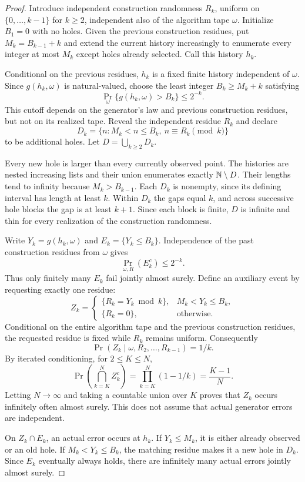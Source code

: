 \begin{proof}
Introduce independent construction randomness $R_k$, uniform on $\{0,\ldots,k-1\}$ for $k\ge2$, independent also of the algorithm tape $\omega$. Initialize $B_1=0$ with no holes. Given the previous construction residues, put $M_k=B_{k-1}+k$ and extend the current history increasingly to enumerate every integer at most $M_k$ except holes already selected. Call this history $h_k$.

Conditional on the previous residues, $h_k$ is a fixed finite history independent of $\omega$. Since $g(h_k,\omega)$ is natural-valued, choose the least integer $B_k\ge M_k+k$ satisfying
\[
\Pr_\omega\{g(h_k,\omega)>B_k\}\le2^{-k}.
\]
This cutoff depends on the generator's law and previous construction residues, but not on its realized tape. Reveal the independent residue $R_k$ and declare
\[
D_k=\{n:M_k<n\le B_k,\ n\equiv R_k\pmod k\}
\]
to be additional holes. Let $D=\bigcup_{k\ge2}D_k$.

Every new hole is larger than every currently observed point. The histories are nested increasing lists and their union enumerates exactly $\mathbb N\setminus D$. Their lengths tend to infinity because $M_k>B_{k-1}$. Each $D_k$ is nonempty, since its defining interval has length at least $k$. Within $D_k$ the gaps equal $k$, and across successive hole blocks the gap is at least $k+1$. Since each block is finite, $D$ is infinite and thin for every realization of the construction randomness.

Write $Y_k=g(h_k,\omega)$ and $E_k=\{Y_k\le B_k\}$. Independence of the past construction residues from $\omega$ gives
\[
\Pr_{\omega,R}(E_k^c)\le2^{-k}.
\]
Thus only finitely many $E_k$ fail jointly almost surely. Define an auxiliary event by requesting exactly one residue:
\[
Z_k=
\begin{cases}
\{R_k=Y_k\bmod k\},& M_k<Y_k\le B_k,\\
\{R_k=0\},&\text{otherwise}.
\end{cases}
\]
Conditional on the entire algorithm tape and the previous construction residues, the requested residue is fixed while $R_k$ remains uniform. Consequently
\[
\Pr(Z_k\mid\omega,R_2,\ldots,R_{k-1})=1/k.
\]
By iterated conditioning, for $2\le K\le N$,
\[
\Pr\left(\bigcap_{k=K}^N Z_k^c\right)
=\prod_{k=K}^N(1-1/k)=\frac{K-1}{N}.
\]
Letting $N\to\infty$ and taking a countable union over $K$ proves that $Z_k$ occurs infinitely often almost surely. This does not assume that actual generator errors are independent.

On $Z_k\cap E_k$, an actual error occurs at $h_k$. If $Y_k\le M_k$, it is either already observed or an old hole. If $M_k<Y_k\le B_k$, the matching residue makes it a new hole in $D_k$. Since $E_k$ eventually always holds, there are infinitely many actual errors jointly almost surely.


\end{proof}
